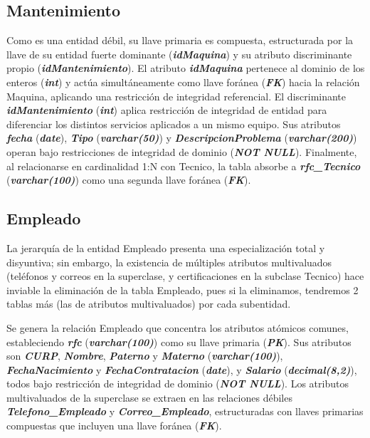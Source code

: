 \documentclass[11pt,letterpaper,spanish]{article}
\begin{document}
\subsection{Mantenimiento}
Como es una entidad débil, su llave primaria es compuesta, estructurada por la llave de su entidad fuerte dominante (\textbf{\textit{idMaquina}}) y su atributo discriminante propio (\textbf{\textit{idMantenimiento}}). El atributo \textbf{\textit{idMaquina}} pertenece al dominio de los enteros (\textbf{\textit{int}}) y actúa simultáneamente como llave foránea (\textbf{\textit{FK}}) hacia la relación Maquina, aplicando una restricción de integridad referencial. El discriminante \textbf{\textit{idMantenimiento}} (\textbf{\textit{int}}) aplica restricción de integridad de entidad para diferenciar los distintos servicios aplicados a un mismo equipo. Sus atributos \textbf{\textit{fecha}} (\textbf{\textit{date}}), \textbf{\textit{Tipo}} (\textbf{\textit{varchar(50)}}) y \textbf{\textit{DescripcionProblema}} (\textbf{\textit{varchar(200)}}) operan bajo restricciones de integridad de dominio (\textbf{\textit{NOT NULL}}). Finalmente, al relacionarse en cardinalidad 1:N con Tecnico, la tabla absorbe a \textbf{\textit{rfc\_Tecnico}} (\textbf{\textit{varchar(100)}}) como una segunda llave foránea (\textbf{\textit{FK}}).

\subsection{Empleado}
La jerarquía de la entidad Empleado presenta una especialización total y disyuntiva; sin embargo, la existencia de múltiples atributos multivaluados (teléfonos y correos en la superclase, y certificaciones en la subclase Tecnico) hace inviable la eliminación de la tabla Empleado, pues si la eliminamos, tendremos 2 tablas más (las de atributos multivaluados) por cada subentidad.

Se genera la relación Empleado que concentra los atributos atómicos comunes, estableciendo \textbf{\textit{rfc}} (\textbf{\textit{varchar(100)}}) como su llave primaria (\textbf{\textit{PK}}). Sus atributos son \textbf{\textit{CURP}}, \textbf{\textit{Nombre}}, \textbf{\textit{Paterno}} y \textbf{\textit{Materno}} (\textbf{\textit{varchar(100)}}), \textbf{\textit{FechaNacimiento}} y \textbf{\textit{FechaContratacion}} (\textbf{\textit{date}}), y \textbf{\textit{Salario}} (\textbf{\textit{decimal(8,2)}}), todos bajo restricción de integridad de dominio (\textbf{\textit{NOT NULL}}). Los atributos multivaluados de la superclase se extraen en las relaciones débiles \textbf{\textit{Telefono\_Empleado}} y \textbf{\textit{Correo\_Empleado}}, estructuradas con llaves primarias compuestas que incluyen una llave foránea (\textbf{\textit{FK}}).
\end{document}
